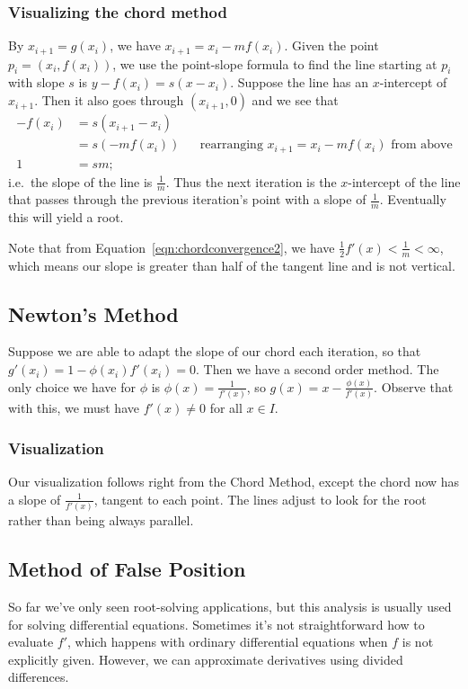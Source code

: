 \documentclass[12pt,letterpaper,DIV=11]{scrartcl}
\theoremstyle{plain}
\theoremstyle{definition}
\theoremstyle{remark}
\begin{document}
\subsubsection{Visualizing the chord method}
By $x_{i + 1} = g(x_i)$, we have $x_{i + 1} = x_i - m f(x_i)$.
Given the point $p_i = (x_i, f(x_i))$, we use the point-slope formula to find the line starting at $p_i$ with slope $s$ is $y - f(x_i) = s (x - x_i)$.
Suppose the line has an $x$-intercept of $x_{i + 1}$.
Then it also goes through $(x_{i + 1}, 0)$ and we see that \begin{align*}
  - f(x_i) &= s (x_{i + 1} - x_i) \\
           &= s (-m f(x_i)) && \text{rearranging $x_{i + 1} = x_i - m f(x_i)$ from above} \\
  1 &= sm;
\end{align*} i.e.\ the slope of the line is $\frac{1}{m}$.
Thus the next iteration is the $x$-intercept of the line that passes through the previous iteration's point with a slope of $\frac{1}{m}$.
Eventually this will yield a root.

Note that from Equation~\ref{eqn:chordconvergence2}, we have $\frac{1}{2} f'(x) < \frac{1}{m} < \infty$, which means our slope is greater than half of the tangent line and is not vertical.

\subsection{Newton's Method}
Suppose we are able to adapt the slope of our chord each iteration, so that $g'(x_i) = 1 - \phi(x_i) f'(x_i) = 0$.
Then we have a second order method.
The only choice we have for $\phi$ is $\phi(x) = \frac{1}{f'(x)}$, so $g(x) = x - \frac{\phi(x)}{f'(x)}$.
Observe that with this, we must have $f'(x) \neq 0$ for all $x \in I$.

\subsubsection{Visualization}
Our visualization follows right from the Chord Method, except the chord now has a slope of $\frac{1}{f'(x)}$, tangent to each point.
The lines adjust to look for the root rather than being always parallel.


\subsection{Method of False Position}
So far we've only seen root-solving applications, but this analysis is usually used for solving differential equations.
Sometimes it's not straightforward how to evaluate $f'$, which happens with ordinary differential equations when $f$ is not explicitly given.
However, we can approximate derivatives using divided differences.
\end{document}
